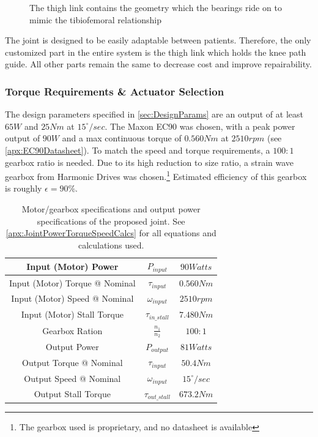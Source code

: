 \begin{figure}[ht!]
    \centering
    \caption{The thigh link contains the geometry which the bearings ride on to mimic the tibiofemoral relationship}
    \label{fig:CenterPlateGeometry}
\end{figure}

The joint is designed to be easily adaptable between patients. Therefore, the only customized part in the entire system is the thigh link which holds the knee path guide. All other parts remain the same to decrease cost and improve repairability.

\subsubsection{Torque Requirements \& Actuator Selection}

The design parameters specified in \autoref{sec:DesignParams} are an output of at least \(65 W\) and \(25 Nm\) at \(15^\circ/sec\). The Maxon EC90 was chosen, with a peak power output of \(90W\) and a max continuous torque of \(0.560 Nm\) at \(2510 rpm\) (see \autoref{apx:EC90Datasheet}). To match the speed and torque requirements, a \(100:1\) gearbox ratio is needed. Due to its high reduction to size ratio, a strain wave gearbox from {Harmonic Drives\texttrademark} was chosen.\footnote{The gearbox used is proprietary, and no datasheet is available} Estimated efficiency of this gearbox is roughly \(\epsilon = 90\%\).

\begin{table}
    \centering
    \begin{tabular}{||c|c|c||}
        \hline
        Input (Motor) Power & \(P_{input}\) & \(90 Watts\) \\
        \hline
        Input (Motor) Torque @ Nominal & \(\tau_{input}\) & \(0.560 Nm\) \\
        \hline
        Input (Motor) Speed @ Nominal & \(\omega_{input}\) & \(2510 rpm\) \\
        \hline
        Input (Motor) Stall Torque & \(\tau_{in\_stall}\) & \(7.480 Nm\) \\
        \hline \hline
        Gearbox Ration & \(\frac{n_1}{n_2}\) & \(100:1\) \\
        \hline \hline
        Output Power & \(P_{output}\) & \(81 Watts\) \\
        \hline
        Output Torque @ Nominal & \(\tau_{input}\) & \(50.4 Nm\) \\
        \hline
        Output Speed @ Nominal & \(\omega_{input}\) & \(15^\circ/sec\) \\
        \hline
        Output Stall Torque & \(\tau_{out\_stall}\) & \(673.2 Nm\) \\
        \hline
    \end{tabular}
    \caption{Motor/gearbox specifications and output power specifications of the proposed joint. See \autoref{apx:JointPowerTorqueSpeedCalcs} for all equations and calculations used.}
    \label{table:MotorGearboxSpecs}
\end{table}

